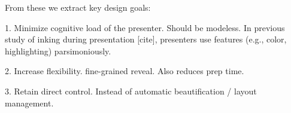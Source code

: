 From these we extract key design goals: 

1. Minimize cognitive load of the presenter. Should be modeless.
In previous study of inking during presentation [cite], presenters use
features (e.g., color, highlighting) parsimoniously.

2. Increase flexibility. fine-grained reveal. Also reduces prep time.

3. Retain direct control. Instead of automatic beautification / layout management. 


